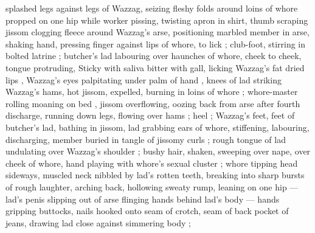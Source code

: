 splashed legs against legs of Wazzag, seizing fleshy folds around loins of whore propped on one hip while worker pissing, twisting apron in shirt, thumb scraping jissom clogging fleece around Wazzag's arse, positioning marbled member in arse, shaking hand, pressing finger against lips of whore, to lick ; club-foot, stirring in bolted latrine ; butcher's lad labouring over haunches of whore, cheek to cheek, tongue protruding, Sticky with saliva bitter with gall, licking Wazzag's fat dried lips , Wazzag's eyes palpitating under palm of hand , knees of lad striking Wazzag's hams, hot jissom, expelled, burning in loins of whore {\thd}  ; whore-master rolling moaning on bed , jissom overflowing, oozing back from arse after fourth discharge, running down legs, flowing over hams ; heel ; Wazzag's feet, feet of butcher's lad, bathing in jissom, lad grabbing ears of whore, stiffening, labouring, discharging, member buried in tangle of jissomy curls  ; rough tongue of lad undulating over Wazzag's shoulder ; bushy hair, shaken, sweeping over nape, over cheek of whore, hand playing with whore's sexual cluster ; whore tipping head sideways, muscled neck nibbled by lad's rotten teeth, breaking into sharp bursts of rough laughter, arching back, hollowing sweaty rump, leaning on one hip --- lad's penis slipping out of arse {\dashcom} flinging hands behind lad's body --- hands gripping buttocks, nails hooked onto seam of crotch, seam of back pocket of jeans, drawing lad close against simmering body ;
